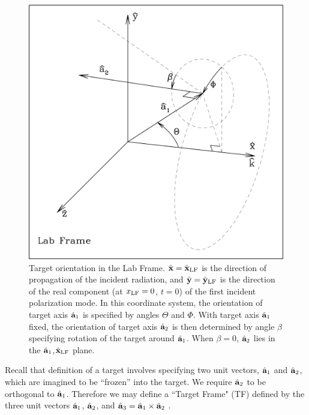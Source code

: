 \begin{figure}[h]
\begin{center}
\vspace*{-0.9cm}
\includegraphics[width=12.cm]{f6.png}
\vspace*{-2.2cm}
\caption{\label{fig:target_orientation}
         \footnotesize
        Target orientation in the Lab Frame.  ${\hat{\bf x}}=\hat{\bf x}_{\rm LF}$ is the
	direction of propagation of the incident radiation, and ${\hat{\bf
	y}}=\hat{\bf y}_{\rm LF}$ is the direction of the real component (at $x_{\rm LF}=0$, $t=0$)
	of the first incident
	polarization mode.  In this coordinate system, the orientation of
	target axis ${\hat{\bf a}}_1$ is specified by angles $\Theta$ and
	$\Phi$.  With target axis ${\hat{\bf a}}_1$ fixed, the orientation of
	target axis ${\hat{\bf a}}_2$ is then determined by angle $\beta$
	specifying rotation of the target around ${\hat{\bf a}}_1$.  When
	$\beta=0$, ${\hat{\bf a}}_2$ lies in the ${\hat{\bf a}}_1$,$\hat{\bf x}_{\rm LF}$
	plane.
	}
\end{center}
\end{figure}

Recall that definition of a target involves specifying two unit
vectors, ${\hat{\bf a}}_1$ and ${\hat{\bf a}}_2$, which are imagined
to be ``frozen'' into the target.  We require ${\hat{\bf a}}_2$ to be
orthogonal to ${\hat{\bf a}}_1$.  Therefore we may define a ``Target
Frame" (TF) defined by the three unit vectors ${\hat{\bf a}}_1$,
${\hat{\bf a}}_2$, and ${\hat{\bf a}}_3 = {\hat{\bf a}}_1 \times
{\hat{\bf a}}_2$ .

